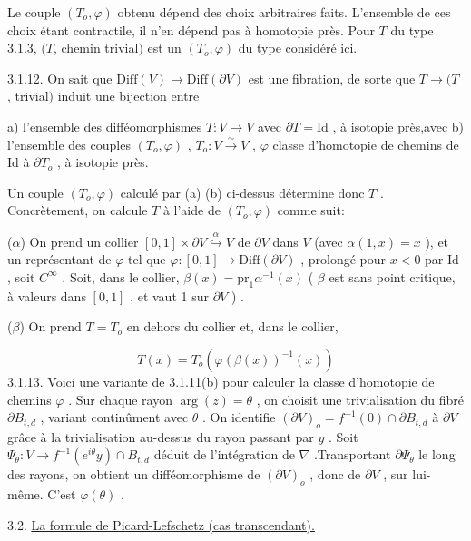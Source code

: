 Le couple $(T_o, \varphi)$ obtenu dépend des choix arbitraires faits. L'ensemble de ces choix étant contractile, il n'en dépend pas à homotopie près. Pour $T$ du type 3.1.3, $(T$, chemin trivial$)$ est un $(T_o, \varphi)$ du type considéré ici.

3.1.12. On sait que $\mathrm{Diff}(V) \longrightarrow \mathrm{Diff}(\partial V)$ est une fibration, de sorte que $T \longrightarrow (T$ , trivial$)$ induit une bijection entre

a) l'ensemble des difféomorphismes $T : V \longrightarrow V$ avec $\partial T = \mathrm{Id}$ , à isotopie près,avec
b) l'ensemble des couples $(T_o, \varphi)$ , $T_o : V \stackrel{\sim}{\longrightarrow} V$ , $\varphi$ classe d'homotopie de chemins de $\mathrm{Id}$ à $\partial T_o$ , à isotopie près.

Un couple $(T_o, \varphi)$ calculé par (a) (b) ci-dessus détermine donc $T$ . Concrètement, on calcule $T$ à l'aide de $(T_o, \varphi)$ comme suit:

($\alpha$) On prend un collier $[0, 1] \times \partial V \stackrel{\alpha}{\hookrightarrow} V$ de $\partial V$ dans $V$ (avec $\alpha(1, x) = x$ ), et un représentant de $\varphi$ tel que $\varphi : [0, 1] \longrightarrow \mathrm{Diff}(\partial V)$ , prolongé pour $x < 0$ par $\mathrm{Id}$ , soit $C^{\infty}$ . Soit, dans le collier, $\beta(x) = \mathrm{pr}_1 \alpha^{-1}(x)$ ( $\beta$ est sans point critique, à valeurs dans $[0, 1]$ , et vaut 1 sur $\partial V$ ) .

($\beta$) On prend $T = T_o$ en dehors du collier et, dans le collier,

\begin{equation*}
T(x) = T_o(\varphi(\beta(x))^{-1}(x))
\end{equation*}
3.1.13. Voici une variante de 3.1.11(b) pour calculer la classe d'homotopie de chemins $\varphi$ . Sur chaque rayon $\arg(z) = \theta$ , on choisit une trivialisation du fibré $\partial B_{t,d}$ , variant continûment avec $\theta$ . On identifie $(\partial V)_o = f^{-1}(0) \cap \partial B_{t,d}$ à $\partial V$ grâce à la trivialisation au-dessus du rayon passant par $y$ . Soit $\Psi_{\theta} : V \longrightarrow f^{-1}(e^{i\theta} y) \cap B_{t,d}$ déduit de l'intégration de $\nabla$ .Transportant $\partial \Psi_{\theta}$ le long des rayons, on obtient un difféomorphisme de $(\partial V)_o$ , donc de $\partial V$ , sur lui-même. C'est $\varphi(\theta)$ .


3.2. \underline{La formule de Picard-Lefschetz (cas transcendant).}

